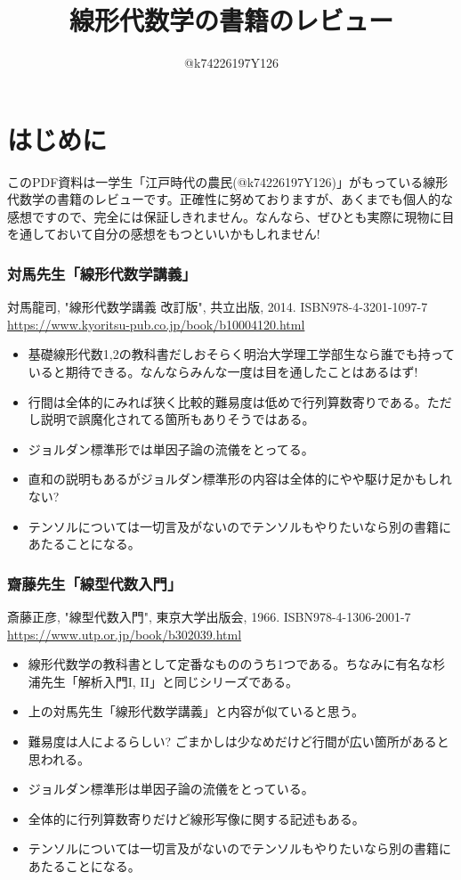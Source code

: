 \documentclass[10pt,a4paper]{jsarticle}
\title{線形代数学の書籍のレビュー}
\author{@k74226197Y126}
\begin{document}
\maketitle
\section*{はじめに}
このPDF資料は一学生「江戸時代の農民(@k74226197Y126)」がもっている線形代数学の書籍のレビューです。正確性に努めておりますが、あくまでも個人的な感想ですので、完全には保証しきれません。なんなら、ぜひとも実際に現物に目を通しておいて自分の感想をもつといいかもしれません! 
\subsubsection*{対馬先生「線形代数学講義」}
対馬龍司, "線形代数学講義 改訂版", 共立出版, 2014. ISBN978-4-3201-1097-7 \url{https://www.kyoritsu-pub.co.jp/book/b10004120.html}
\begin{itemize}
    \item 基礎線形代数1,2の教科書だしおそらく明治大学理工学部生なら誰でも持っていると期待できる。なんならみんな一度は目を通したことはあるはず! 
    \item 行間は全体的にみれば狭く比較的難易度は低めで行列算数寄りである。ただし説明で誤魔化されてる箇所もありそうではある。
    \item ジョルダン標準形では単因子論の流儀をとってる。
    \item 直和の説明もあるがジョルダン標準形の内容は全体的にやや駆け足かもしれない? 
    \item テンソルについては一切言及がないのでテンソルもやりたいなら別の書籍にあたることになる。
\end{itemize}
\subsubsection*{齋藤先生「線型代数入門」}
斎藤正彦, "線型代数入門", 東京大学出版会, 1966. ISBN978-4-1306-2001-7 \url{https://www.utp.or.jp/book/b302039.html}
\begin{itemize}
    \item 線形代数学の教科書として定番なもののうち1つである。ちなみに有名な杉浦先生「解析入門I, II」と同じシリーズである。
    \item 上の対馬先生「線形代数学講義」と内容が似ていると思う。
    \item 難易度は人によるらしい? ごまかしは少なめだけど行間が広い箇所があると思われる。
    \item ジョルダン標準形は単因子論の流儀をとっている。
    \item 全体的に行列算数寄りだけど線形写像に関する記述もある。
    \item テンソルについては一切言及がないのでテンソルもやりたいなら別の書籍にあたることになる。
\end{itemize}
\end{document}
